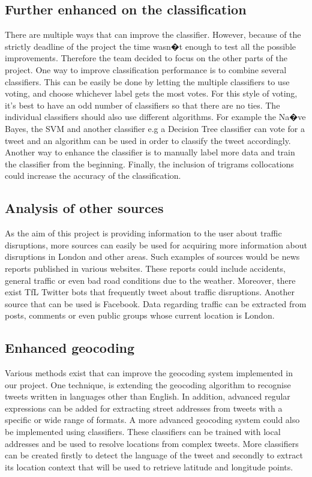 \subsection{Further enhanced on the classification}
There are multiple ways that can improve the classifier. However, because of the strictly deadline of the project the time wasn�t enough to test all the possible improvements. Therefore the team decided to focus on the other parts of the project. One way to improve classification performance is to combine several classifiers. This can be easily be done by letting the multiple classifiers to use voting, and choose whichever label gets the most votes. For this style of voting, it's best to have an odd number of classifiers so that there are no ties. The individual classifiers should also use different algorithms. For example the Na�ve Bayes, the SVM and another classifier e.g a Decision Tree classifier can vote for a tweet and an algorithm can be used in order to classify the tweet accordingly.  Another way to enhance the classifier is to manually label more data and train the classifier from the beginning. Finally, the inclusion of trigrams collocations could increase the accuracy of the classification.  

\subsection{Analysis of other sources}
As the aim of this project is providing information to the user about traffic disruptions, more sources can 
easily be used for acquiring more information about disruptions in London and other areas. Such examples 
of sources would be news reports published in various websites. These reports could include accidents, general traffic or even 
bad road conditions due to the weather. Moreover, there exist TfL Twitter bots that frequently tweet
about traffic disruptions. Another source that can be used is Facebook. Data regarding traffic can be
extracted from posts, comments or even public groups whose current location is London.

\subsection{Enhanced geocoding}
Various methods exist that can improve the geocoding system implemented in our project. One technique, is extending the geocoding algorithm to recognise tweets written in languages other than English. In addition, advanced regular expressions can be added for extracting street addresses from tweets with a specific or wide range of formats. A more advanced geocoding system could also be implemented using classifiers. These classifiers can be trained with local addresses and be used to resolve locations from complex tweets. More classifiers can be created firstly to detect the language of the tweet and secondly to extract its location context that will be used to retrieve latitude and longitude points.
